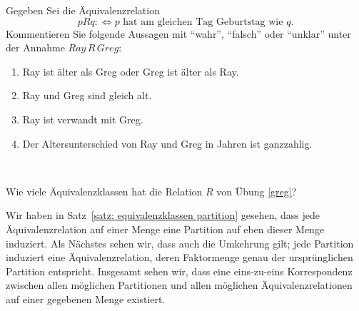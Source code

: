     \begin{ueb}\label{greg}
        Gegeben Sei die Äquivalenzrelation
        \[
            pRq:\Leftrightarrow\text{$p$ hat am gleichen Tag Geburtstag wie $q$.}
        \]
        Kommentieren Sie folgende Aussagen mit ``wahr'', ``falsch'' oder ``unklar'' unter der
        Annahme $Ray\, R\, Greg $:
        \begin{enumerate}
            \item Ray ist älter als Greg oder Greg ist älter als Ray.
            \item Ray und Greg sind gleich alt.
            \item Ray ist verwandt mit Greg.
            \item Der Altersunterschied von Ray und Greg in Jahren ist ganzzahlig.
        \end{enumerate}
    \end{ueb}
    \begin{lsg}
            {~
                \answerspace{2cm}}
    \end{lsg}

    \begin{ueb}
        Wie viele Äquivalenzklassen hat die Relation $R$ von Übung \ref{greg}?
    \end{ueb}
    \begin{lsg}
    \end{lsg}

    Wir haben in Satz~\ref{satz: equivalenzklassen partition} gesehen, dass jede 	Äquivalenzrelation auf einer Menge eine Partition auf eben dieser Menge induziert. Als Nächstes sehen wir, dass auch die Umkehrung gilt; jede Partition induziert eine Äquivalenzrelation, deren Faktormenge genau der ursprünglichen Partition entspricht. Insgesamt sehen wir, dass eine eins-zu-eins Korrespondenz zwischen allen möglichen Partitionen und allen möglichen Äquivalenzrelationen auf einer gegebenen Menge existiert.

